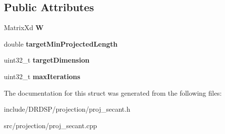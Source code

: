 \subsection*{Public Attributes}
\begin{DoxyCompactItemize}
\item 
\hypertarget{struct_d_r_d_s_p_1_1_proj_secant_a99ab0daf8cb539f9ecf07132d3994357}{Matrix\-Xd {\bfseries W}}\label{struct_d_r_d_s_p_1_1_proj_secant_a99ab0daf8cb539f9ecf07132d3994357}

\item 
\hypertarget{struct_d_r_d_s_p_1_1_proj_secant_a422dde54e49a8b5ab4f631fc0b8cf829}{double {\bfseries target\-Min\-Projected\-Length}}\label{struct_d_r_d_s_p_1_1_proj_secant_a422dde54e49a8b5ab4f631fc0b8cf829}

\item 
\hypertarget{struct_d_r_d_s_p_1_1_proj_secant_aa74d47b541db9bf256f9602e2ae0646a}{uint32\-\_\-t {\bfseries target\-Dimension}}\label{struct_d_r_d_s_p_1_1_proj_secant_aa74d47b541db9bf256f9602e2ae0646a}

\item 
\hypertarget{struct_d_r_d_s_p_1_1_proj_secant_afa9954dc50be3af121c7590879782afa}{uint32\-\_\-t {\bfseries max\-Iterations}}\label{struct_d_r_d_s_p_1_1_proj_secant_afa9954dc50be3af121c7590879782afa}

\end{DoxyCompactItemize}


The documentation for this struct was generated from the following files\-:\begin{DoxyCompactItemize}
\item 
include/\-D\-R\-D\-S\-P/projection/proj\-\_\-secant.\-h\item 
src/projection/proj\-\_\-secant.\-cpp\end{DoxyCompactItemize}

